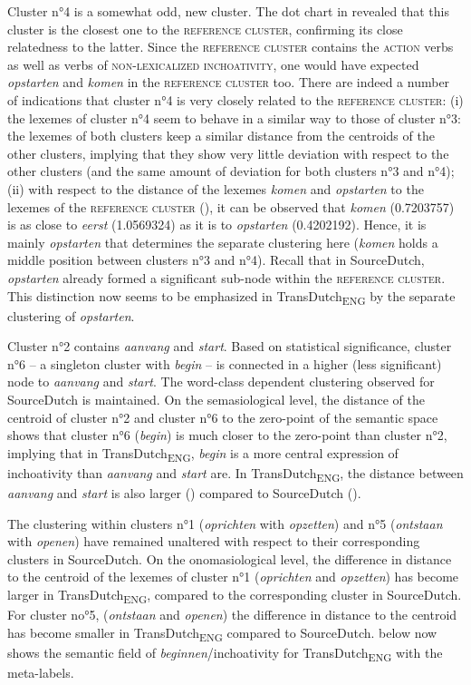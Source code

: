 Cluster n°4 is a somewhat odd, new cluster. The dot chart in  revealed that this cluster is the closest one to the \textsc{reference cluster}, confirming its close relatedness to the latter. Since the \textsc{reference cluster} contains the \textsc{action} verbs as well as verbs of {\textsc{non-lexicalized inchoativity}}, one would have expected \textit{opstarten} and \textit{komen} in the \textsc{reference cluster} too. There are indeed a number of indications that cluster n°4 is very closely related to the \textsc{reference cluster}: (i) the lexemes of cluster n°4 seem to behave in a similar way to those of cluster n°3: the lexemes of both clusters keep a similar distance from the centroids of the other clusters, implying that they show very little deviation with respect to the other clusters (and the same amount of deviation for both clusters n°3 and n°4); (ii) with respect to the distance of the lexemes \textit{komen} and \textit{opstarten} to the lexemes of the \textsc{reference cluster} (), it can be observed that \textit{komen} (0.7203757) is as close to \textit{eerst} (1.0569324) as it is to \textit{opstarten} (0.4202192). Hence, it is mainly \textit{opstarten} that determines the separate clustering here (\textit{komen} holds a middle position between clusters n°3 and n°4). Recall that in SourceDutch, \textit{opstarten} already formed a significant sub-node within the \textsc{reference cluster}. This distinction now seems to be emphasized in TransDutch\textsubscript{ENG} by the separate clustering of \textit{opstarten}.

Cluster n°2 contains \textit{aanvang} and \textit{start}. Based on statistical significance, cluster n°6 – a singleton cluster with \textit{begin} – is connected in a higher (less significant) node to \textit{aanvang} and \textit{start}. The word-class dependent clustering observed for SourceDutch is maintained. On the semasiological level, the distance of the centroid of cluster n°2 and cluster n°6 to the zero-point of the semantic space shows that cluster n°6 (\textit{begin}) is much closer to the zero-point than cluster n°2, implying that in TransDutch\textsubscript{ENG}, \textit{begin} is a more central expression of inchoativity than \textit{aanvang} and \textit{start} are. In TransDutch\textsubscript{ENG}, the distance between \textit{aanvang} and \textit{start} is also larger () compared to SourceDutch ().

The clustering within clusters n°1 (\textit{oprichten} with \textit{opzetten}) and n°5 (\textit{ontstaan} with \textit{openen}) have remained unaltered with respect to their corresponding clusters in SourceDutch. On the onomasiological level, the difference in distance to the centroid of the lexemes of cluster n°1 (\textit{oprichten} and \textit{opzetten}) has become larger in TransDutch\textsubscript{ENG}, compared to the corresponding cluster in SourceDutch. For cluster no°5, (\textit{ontstaan} and \textit{openen}) the difference in distance to the centroid has become smaller in TransDutch\textsubscript{ENG} compared to SourceDutch.  below now shows the semantic field of \textit{beginnen}/inchoativity for TransDutch\textsubscript{ENG} with the meta-labels.


